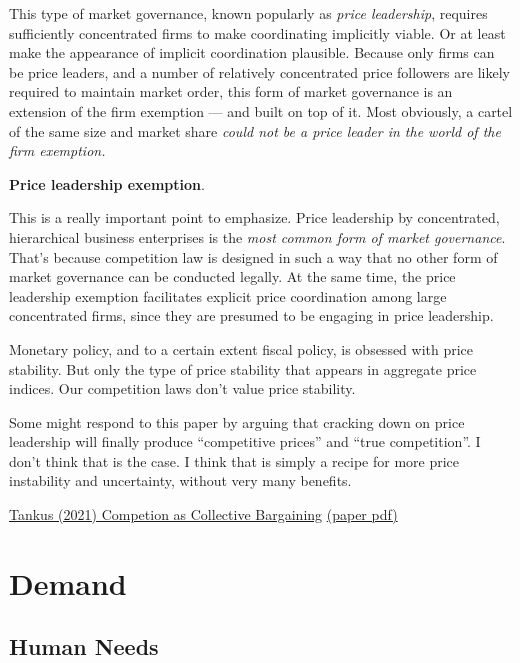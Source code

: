 \documentclass[
]{book}
\begin{document}
This type of market governance, known popularly as \emph{price leadership}, requires sufficiently concentrated firms to make coordinating implicitly viable. Or at least make the appearance of implicit coordination plausible. Because only firms can be price leaders, and a number of relatively concentrated price followers are likely required to maintain market order, this form of market governance is an extension of the firm exemption --- and built on top of it. Most obviously, a cartel of the same size and market share \emph{could not be a price leader in the world of the firm exemption.}

\textbf{Price leadership exemption}.

This is a really important point to emphasize. Price leadership by concentrated, hierarchical business enterprises is the \emph{most common form of market governance}. That's because competition law is designed in such a way that no other form of market governance can be conducted legally. At the same time, the price leadership exemption facilitates explicit price coordination among large concentrated firms, since they are presumed to be engaging in price leadership.

Monetary policy, and to a certain extent fiscal policy, is obsessed with price stability. But only the type of price stability that appears in aggregate price indices. Our competition laws don't value price stability.

Some might respond to this paper by arguing that cracking down on price leadership will finally produce ``competitive prices'' and ``true competition''. I don't think that is the case. I think that is simply a recipe for more price instability and uncertainty, without very many benefits.

\href{https://www.crisesnotes.com/competition-law-as-collective-bargaining-law-published-paper-preview/}{Tankus (2021) Competion as Collective Bargaining}
\href{pdf/Tankus_2021_Competion_Bargaining.pdf}{(paper pdf)}

\hypertarget{demand}{%
\chapter{Demand}\label{demand}}

\hypertarget{human-needs}{%
\section{Human Needs}\label{human-needs}}
\end{document}
